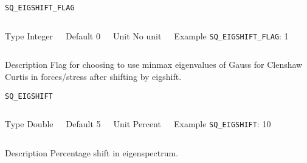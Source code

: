 \begin{frame}[allowframebreaks]{\texttt{SQ\_EIGSHIFT\_FLAG}} \label{SQ_EIGSHIFT_FLAG}
\vspace*{-12pt}
\begin{columns}
\begin{block}{Type}
Integer
\end{block}

\begin{block}{Default}
0
\end{block}

\begin{block}{Unit}
No unit
\end{block}

\begin{block}{Example}
\texttt{SQ\_EIGSHIFT\_FLAG}: 1
\end{block}
\end{columns}

\begin{block}{Description}
Flag for choosing to use minmax eigenvalues of Gauss for Clenshaw Curtis in forces/stress after shifting by eigshift.
\end{block}

\end{frame}


\begin{frame}[allowframebreaks]{\texttt{SQ\_EIGSHIFT}} \label{SQ_EIGSHIFT}
\vspace*{-12pt}
\begin{columns}
\begin{block}{Type}
Double
\end{block}

\begin{block}{Default}
5
\end{block}

\begin{block}{Unit}
Percent
\end{block}

\begin{block}{Example}
\texttt{SQ\_EIGSHIFT}: 10
\end{block}
\end{columns}

\begin{block}{Description}
Percentage shift in eigenspectrum.
\end{block}

\end{frame}

